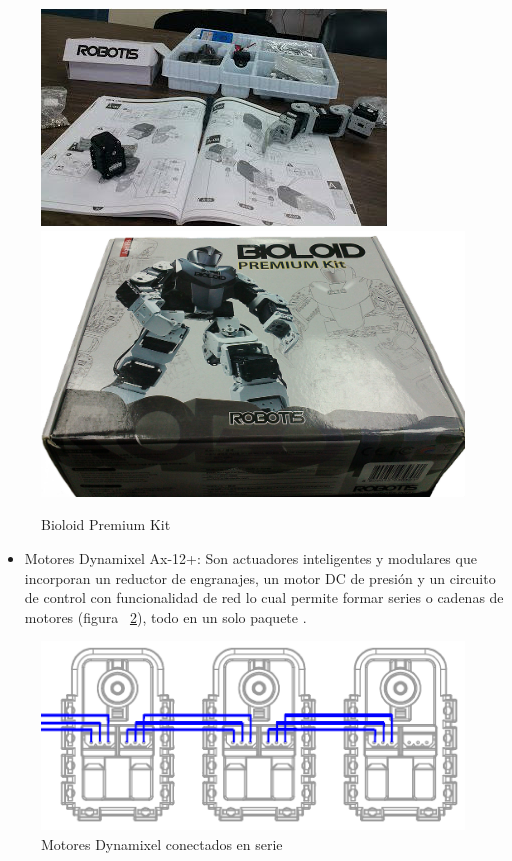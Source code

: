\begin{figure}[hbtp]
\centering
\includegraphics[scale=0.5]{imagenes/kitAfuera.jpg}
\includegraphics[scale=0.07]{imagenes/cajaKit.jpg}
\caption{Bioloid Premium Kit}
\label{fig:kit}
\end{figure}



\begin{itemize}

\item Motores Dynamixel Ax-12+: Son actuadores inteligentes y modulares que incorporan un reductor de engranajes, un motor DC de presión y un circuito de control con funcionalidad de red lo cual permite formar series o cadenas de motores (figura ~\ref{fig:motoresDc}), todo en un solo paquete \cite{manual}. 
\end{itemize}

\begin{figure}[hbtp]

\centering
\includegraphics[scale=0.5]{imagenes/AX-12_serie.png}
\caption{Motores Dynamixel conectados en serie}
\label{fig:motoresDc}
\end{figure}


